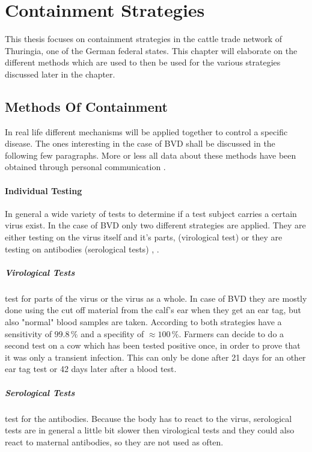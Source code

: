 \section{Containment Strategies}\label{chap:containmentBasics}
This thesis focuses on containment strategies in the cattle trade network of Thuringia, one of the German federal states. This chapter will elaborate on the different methods which are used to then be used for the various strategies discussed later in the chapter.

\subsection{Methods Of Containment}
In real life different mechanisms will be applied together to control a specific disease. The ones interesting in the case of BVD shall be discussed in the following few paragraphs. More or less all data about these methods have been obtained through personal communication \citep{personalCom}.

\paragraph{Individual Testing}
In general a wide variety of tests to determine if a test subject carries a certain virus exist. In the case of BVD only two different strategies are applied. They are either testing on the virus itself and it's parts, (virological test) or they are testing on antibodies (serological tests) \citep{haller1999diagnostik}, \citep{personalCom}. 

\subparagraph{Virological Tests} test for parts of the virus or the virus as a whole. In case of BVD they are mostly done using the cut off material from the calf's ear when they get an ear tag, but also "normal" blood samples are taken. According to \citep{personalCom} both strategies have a sensitivity of $99.8\,\%$ and a specifity of $\approx 100\,\%$. Farmers can decide to do a second test on a cow which has been tested positive once, in order to prove that it was only a transient infection. This can only be done after 21 days for an other ear tag test or 42 days later after a blood test.

\subparagraph{Serological Tests} test for the antibodies. Because the body has to react to the virus, serological tests are in general a little bit slower then virological tests and they could also react to maternal antibodies, so they are not used as often.


